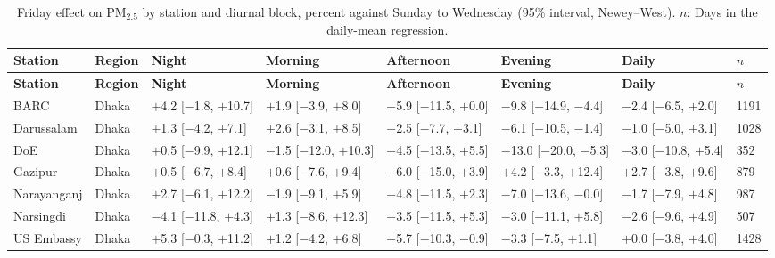 \begingroup\footnotesize
\begin{longtable}{L{2.8cm} L{1.4cm} C{2.0cm} C{2.0cm} C{2.0cm} C{2.0cm} C{2.0cm} C{0.9cm}}
\caption{Friday effect on PM$_{2.5}$ by station and diurnal block, percent against Sunday to Wednesday (95\% interval, Newey--West). $n$: Days in the daily-mean regression.}\label{tab:s-station}\\
\toprule
\textbf{Station} & \textbf{Region} & \textbf{Night} & \textbf{Morning} & \textbf{Afternoon} & \textbf{Evening} & \textbf{Daily} & \textbf{$n$} \\
\midrule\endfirsthead
\toprule
\textbf{Station} & \textbf{Region} & \textbf{Night} & \textbf{Morning} & \textbf{Afternoon} & \textbf{Evening} & \textbf{Daily} & \textbf{$n$} \\
\midrule\endhead
\bottomrule\endfoot
BARC & Dhaka & $+$4.2 {\scriptsize[$-$1.8, $+$10.7]} & $+$1.9 {\scriptsize[$-$3.9, $+$8.0]} & $-$5.9 {\scriptsize[$-$11.5, $+$0.0]} & $-$9.8 {\scriptsize[$-$14.9, $-$4.4]} & $-$2.4 {\scriptsize[$-$6.5, $+$2.0]} & 1191 \\
Darussalam & Dhaka & $+$1.3 {\scriptsize[$-$4.2, $+$7.1]} & $+$2.6 {\scriptsize[$-$3.1, $+$8.5]} & $-$2.5 {\scriptsize[$-$7.7, $+$3.1]} & $-$6.1 {\scriptsize[$-$10.5, $-$1.4]} & $-$1.0 {\scriptsize[$-$5.0, $+$3.1]} & 1028 \\
DoE & Dhaka & $+$0.5 {\scriptsize[$-$9.9, $+$12.1]} & $-$1.5 {\scriptsize[$-$12.0, $+$10.3]} & $-$4.5 {\scriptsize[$-$13.5, $+$5.5]} & $-$13.0 {\scriptsize[$-$20.0, $-$5.3]} & $-$3.0 {\scriptsize[$-$10.8, $+$5.4]} & 352 \\
Gazipur & Dhaka & $+$0.5 {\scriptsize[$-$6.7, $+$8.4]} & $+$0.6 {\scriptsize[$-$7.6, $+$9.4]} & $-$6.0 {\scriptsize[$-$15.0, $+$3.9]} & $+$4.2 {\scriptsize[$-$3.3, $+$12.4]} & $+$2.7 {\scriptsize[$-$3.8, $+$9.6]} & 879 \\
Narayanganj & Dhaka & $+$2.7 {\scriptsize[$-$6.1, $+$12.2]} & $-$1.9 {\scriptsize[$-$9.1, $+$5.9]} & $-$4.8 {\scriptsize[$-$11.5, $+$2.3]} & $-$7.0 {\scriptsize[$-$13.6, $-$0.0]} & $-$1.7 {\scriptsize[$-$7.9, $+$4.8]} & 987 \\
Narsingdi & Dhaka & $-$4.1 {\scriptsize[$-$11.8, $+$4.3]} & $+$1.3 {\scriptsize[$-$8.6, $+$12.3]} & $-$3.5 {\scriptsize[$-$11.5, $+$5.3]} & $-$3.0 {\scriptsize[$-$11.1, $+$5.8]} & $-$2.6 {\scriptsize[$-$9.6, $+$4.9]} & 507 \\
US Embassy & Dhaka & $+$5.3 {\scriptsize[$-$0.3, $+$11.2]} & $+$1.2 {\scriptsize[$-$4.2, $+$6.8]} & $-$5.7 {\scriptsize[$-$10.3, $-$0.9]} & $-$3.3 {\scriptsize[$-$7.5, $+$1.1]} & $+$0.0 {\scriptsize[$-$3.8, $+$4.0]} & 1428 \\

\end{longtable}
